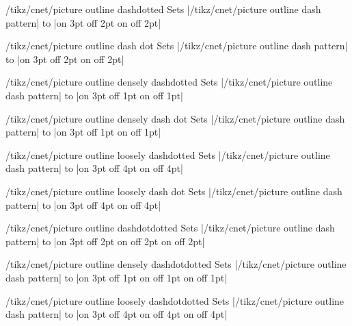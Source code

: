 \documentclass[a4paper]{ltxdoc}
\begin{document}
\begin{stylekey}{/tikz/cnet/picture outline dashdotted}
  Sets |/tikz/cnet/picture outline dash pattern| to |on 3pt off 2pt on \the\pgflinewidth off 2pt|
\end{stylekey}

\begin{stylekey}{/tikz/cnet/picture outline dash dot}
  Sets |/tikz/cnet/picture outline dash pattern| to |on 3pt off 2pt on \the\pgflinewidth off 2pt|
\end{stylekey}

\begin{stylekey}{/tikz/cnet/picture outline densely dashdotted}
  Sets |/tikz/cnet/picture outline dash pattern| to |on 3pt off 1pt on \the\pgflinewidth off 1pt|
\end{stylekey}

\begin{stylekey}{/tikz/cnet/picture outline densely dash dot}
  Sets |/tikz/cnet/picture outline dash pattern| to |on 3pt off 1pt on \the\pgflinewidth off 1pt|
\end{stylekey}

\begin{stylekey}{/tikz/cnet/picture outline loosely dashdotted}
  Sets |/tikz/cnet/picture outline dash pattern| to |on 3pt off 4pt on \the\pgflinewidth off 4pt|%
\end{stylekey}

\begin{stylekey}{/tikz/cnet/picture outline loosely dash dot}
  Sets |/tikz/cnet/picture outline dash pattern| to |on 3pt off 4pt on \the\pgflinewidth off 4pt|
\end{stylekey}

\begin{stylekey}{/tikz/cnet/picture outline dashdotdotted}
  Sets |/tikz/cnet/picture outline dash pattern| to |on 3pt off 2pt on \the\pgflinewidth off 2pt on \the\pgflinewidth off 2pt|
\end{stylekey}

\begin{stylekey}{/tikz/cnet/picture outline densely dashdotdotted}
  Sets |/tikz/cnet/picture outline dash pattern| to |on 3pt off 1pt on \the\pgflinewidth off 1pt on \the\pgflinewidth off 1pt|
\end{stylekey}

\begin{stylekey}{/tikz/cnet/picture outline loosely dashdotdotted}
  Sets |/tikz/cnet/picture outline dash pattern| to |on 3pt off 4pt on \the\pgflinewidth off 4pt on \the\pgflinewidth off 4pt|
\end{stylekey}
\end{document}
